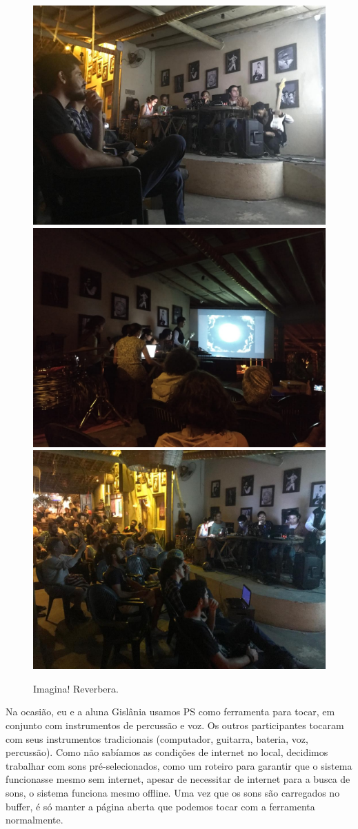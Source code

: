 \begin{figure}

\includegraphics[width=0.7\linewidth]{pictures/cap4/imagina1a}
\includegraphics[width=0.7\linewidth]{pictures/cap4/imagina1b}
\includegraphics[width=0.7\linewidth]{pictures/cap4/imagina1c}
\caption{Imagina! Reverbera.}
\label{Fotos: Juliana Gontijo}
\label{diagram}
\end{figure}


Na ocasião, eu e a aluna Gislânia usamos PS como ferramenta para tocar, em conjunto com instrumentos de percussão e voz. Os outros participantes tocaram com seus instrumentos tradicionais (computador, guitarra, bateria, voz, percussão). Como não sabíamos as condições de internet no local, decidimos trabalhar com sons pré-selecionados, como um roteiro para garantir que o sistema funcionasse mesmo sem internet, apesar de necessitar de internet para a busca de sons, o sistema funciona mesmo offline. Uma vez que os sons são carregados no buffer, é só manter a página aberta que podemos tocar com a ferramenta normalmente.

